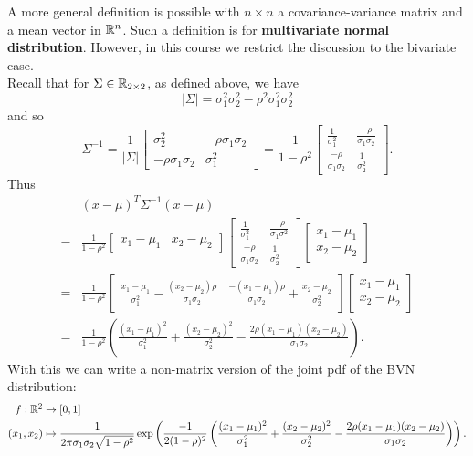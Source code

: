 \documentclass[11pt,fleqn]{book} %
\begin{document}
\begin{remark} \label{rmk:2102}
A more general definition is possible with \(n \times n\) a covariance-variance matrix and a mean vector in \(\mathbb{R}^n\). Such a definition is for \textbf{multivariate normal distribution}. However, in this course we restrict the discussion to the bivariate case. \\
\indent Recall that for \(\Sigma \in \mathbb{R}_{2\times2}\), as defined above, we have
\[
|\Sigma| = \sigma_1^2\sigma_2^2 - \rho^2\sigma_1^2\sigma_2^2
\]
and so
\[
\Sigma^{-1} = \frac{1}{|\Sigma|}
\begin{bmatrix}
\sigma_2^2 & -\rho\sigma_1\sigma_2 \\
-\rho\sigma_1\sigma_2 & \sigma_1^2
\end{bmatrix} = 
\frac{1}{1 - \rho^2}
\begin{bmatrix}
\frac{1}{\sigma_1^2} & \frac{-\rho}{\sigma_1\sigma_2} \\
\frac{-\rho}{\sigma_1\sigma_2} & \frac{1}{\sigma_2^2}
\end{bmatrix}.
\]
\indent Thus 
\[
\begin{aligned}
&(x - \mu)^T\Sigma^{-1}(x - \mu) \\
= &\frac{1}{1 - \rho^2}\begin{bmatrix}x_1 - \mu_1 & x_2 - \mu_2\end{bmatrix} 
\begin{bmatrix} \frac{1}{\sigma_1^2} & \frac{-\rho}{\sigma_1\sigma^2} \\
\frac{-\rho}{\sigma_1\sigma_2} & \frac{1}{\sigma_2^2}
\end{bmatrix}
\begin{bmatrix} x_1 - \mu_1 \\ x_2 - \mu_2 \end{bmatrix} \\
= &\frac{1}{1 - \rho^2}\begin{bmatrix}\frac{x_1 - \mu_1}{\sigma_1^2} - \frac{(x_2 - \mu_2)\rho}{\sigma_1\sigma_2} & \frac{-(x_1 - \mu_1)\rho}{\sigma_1\sigma_2} + \frac{x_2 - \mu_2}{\sigma_2^2}\end{bmatrix}\begin{bmatrix} x_1 - \mu_1 \\ x_2 - \mu_2\end{bmatrix} \\
= & \frac{1}{1 - \rho^2} \left(\frac{(x_1 - \mu_1)^2}{\sigma_1^2} + \frac{(x_2 - \mu_2)^2}{\sigma_2^2} - \frac{2\rho(x_1 - \mu_1)(x_2 - \mu_2)}{\sigma_1\sigma_2}\right).
\end{aligned}
\]
\indent With this we can write a non-matrix version of the joint pdf of the BVN distribution:
\[
\begin{aligned}
f:\mathbb{R}^2 &\rightarrow [0, 1] \\
(x_1, x_2) &\mapsto \frac{1}{2\pi\sigma_1\sigma_2\sqrt{1 - \rho^2}}\exp\left(\frac{-1}{2(1 - \rho)^2}\left(\frac{(x_1 - \mu_1)^2}{\sigma_1^2} + \frac{(x_2 - \mu_2)^2}{\sigma_2^2} - \frac{2\rho(x_1 - \mu_1)(x_2 - \mu_2)}{\sigma_1\sigma_2}\right)\right).
\end{aligned}
\]
\end{remark}
\end{document}
